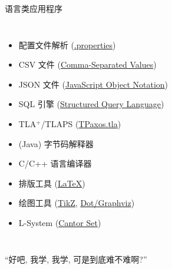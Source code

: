 \begin{frame}{}
  \begin{center}
    {\Large 语言类应用程序}
  \end{center}

  \begin{columns}
      \begin{itemize}
        \setlength{\itemsep}{6pt}
        \item 配置文件解析 (\href{https://en.wikipedia.org/wiki/.properties}{.properties})
        \item CSV 文件 (\href{https://en.wikipedia.org/wiki/Comma-separated_values\#/media/File:CsvDelimited001.svg}{Comma-Separated Values})
        \item JSON 文件 (\href{https://en.wikipedia.org/wiki/JSON\#Syntax}{JavaScript Object Notation})
        \vspace{8pt}
        \pause
        \item SQL 引擎 (\href{https://en.wikipedia.org/wiki/SQL_syntax}{Structured Query Language})
        \item TLA$^{+}$/TLAPS (\href{https://github.com/Starydark/PaxosStore-tla/blob/master/theorem\%20proving/TPaxos.tla}{TPaxos.tla})
        \item (Java) 字节码解释器
        \item C/C++ 语言编译器
        \vspace{8pt}
        \pause
        \item 排版工具 (\href{https://github.com/courses-at-nju-by-hfwei/compilers-lectures/blob/master/2024/0-overview/parts/course.tex}{\LaTeX})
        \item 绘图工具 (\href{https://www.overleaf.com/learn/latex/TikZ_package}{TikZ},
          \href{https://renenyffenegger.ch/notes/tools/Graphviz/examples/index}{Dot/Graphviz})
        \item L-System (\href{https://en.wikipedia.org/wiki/L-system\#Example_3:_Cantor_set}{Cantor Set})
      \end{itemize}
  \end{columns}
\end{frame}

\begin{frame}{}
  \begin{center}
    ``好吧, 我学, 我学, 可是到底难不难啊?''
  \end{center}
\end{frame}

